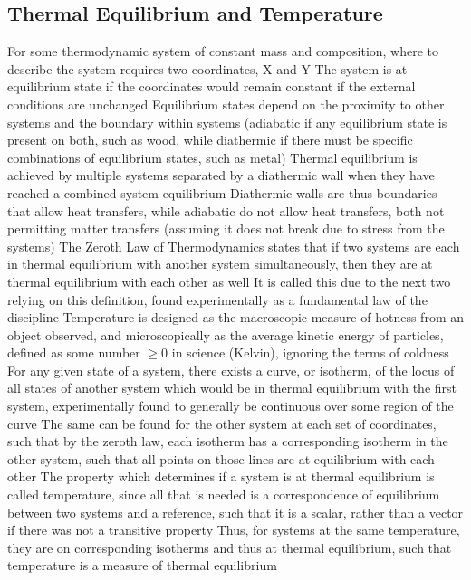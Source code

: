\documentclass[11 pt, twoside]{article}
\newenvironment{outline*}
{
	\begin{outline}[enumerate]
	}
	{\end{outline}
}
\begin{document}
\subsection{Thermal Equilibrium and Temperature}
\begin{outline*}
\1 For some thermodynamic system of constant mass and composition, where to describe the system requires two coordinates, X and Y
\2 The system is at equilibrium state if the coordinates would remain constant if the external conditions are unchanged
\2 Equilibrium states depend on the proximity to other systems and the boundary within systems (adiabatic if any equilibrium state is present on both, such as wood, while diathermic if there must be specific combinations of equilibrium states, such as metal)
\3 Thermal equilibrium is achieved by multiple systems separated by a diathermic wall when they have reached a combined system equilibrium
\3 Diathermic walls are thus boundaries that allow heat transfers, while adiabatic do not allow heat transfers, both not permitting matter transfers (assuming it does not break due to stress from the systems)
\2 The Zeroth Law of Thermodynamics states that if two systems are each in thermal equilibrium with another system simultaneously, then they are at thermal equilibrium with each other as well
\3 It is called this due to the next two relying on this definition, found experimentally as a fundamental law of the discipline
\1 Temperature is designed as the macroscopic measure of hotness from an object observed, and microscopically as the average kinetic energy of particles, defined as some number $\geq 0$ in science (Kelvin), ignoring the terms of coldness
\2 For any given state of a system, there exists a curve, or isotherm, of the locus of all states of another system which would be in thermal equilibrium with the first system, experimentally found to generally be continuous over some region of the curve
\3 The same can be found for the other system at each set of coordinates, such that by the zeroth law, each isotherm has a corresponding isotherm in the other system, such that all points on those lines are at equilibrium with each other
\3 The property which determines if a system is at thermal equilibrium is called temperature, since all that is needed is a correspondence of equilibrium between two systems and a reference, such that it is a scalar, rather than a vector if there was not a transitive property
\2 Thus, for systems at the same temperature, they are on corresponding isotherms and thus at thermal equilibrium, such that temperature is a measure of thermal equilibrium

\end{outline*}
\end{document}
